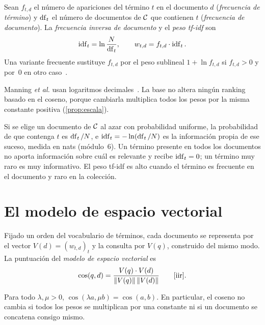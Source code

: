 \begin{definicion}\label{def:tfidf}
Sean $f_{t,d}$ el número de apariciones del término $t$ en el documento $d$ (\emph{frecuencia de término}) y $\operatorname{df}_t$ el número de documentos de $\mathcal{C}$ que contienen $t$ (\emph{frecuencia de documento}). La \emph{frecuencia inversa de documento} y el \emph{peso tf-idf} son
\[
\operatorname{idf}_t=\ln\frac{N}{\operatorname{df}_t},\qquad w_{t,d}=f_{t,d}\cdot\operatorname{idf}_t .
\]
Una variante frecuente sustituye $f_{t,d}$ por el peso sublineal $1+\ln f_{t,d}$ si $f_{t,d}>0$ y por~$0$ en otro caso~\cite[§6.4.1]{iir}.
\end{definicion}

Manning \emph{et al.} usan logaritmos decimales~\cite[§6.2.1]{iir}. La base no altera ningún ranking basado en el coseno, porque cambiarla multiplica todos los pesos por la misma constante positiva (\cref{prop:escala}).

\begin{observacion}\label{obs:idf-info}
Si se elige un documento de $\mathcal{C}$ al azar con probabilidad uniforme, la probabilidad de que contenga $t$ es $\operatorname{df}_t/N$, e $\operatorname{idf}_t=-\ln(\operatorname{df}_t/N)$ es la información propia de ese suceso, medida en nats (módulo~6). Un término presente en todos los documentos no aporta información sobre cuál es relevante y recibe $\operatorname{idf}_t=0$; un término muy raro es muy informativo. El peso tf-idf es alto cuando el término es frecuente en el documento y raro en la colección.
\end{observacion}

\section{El modelo de espacio vectorial}

\begin{definicion}\label{def:coseno}
Fijado un orden del vocabulario de términos, cada documento se representa por el vector $V(d)=(w_{t,d})_t$ y la consulta por $V(q)$, construido del mismo modo. La puntuación del \emph{modelo de espacio vectorial} es
\[
\cos(q,d)=\frac{V(q)\cdot V(d)}{\norm{V(q)}\,\norm{V(d)}}\qquad\text{\cite[§6.3]{iir}}.
\]
\end{definicion}

\begin{proposicion}\label{prop:escala}
Para todo $\lambda,\mu>0$, $\cos(\lambda a,\mu b)=\cos(a,b)$. En particular, el coseno no cambia si todos los pesos se multiplican por una constante ni si un documento se concatena consigo mismo.
\end{proposicion}

